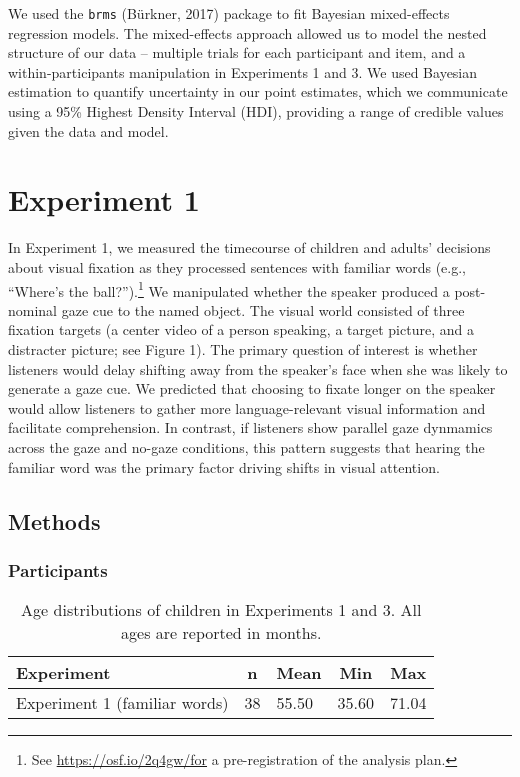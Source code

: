\documentclass[man,floatsintext]{apa6}
\let\rmarkdownfootnote\footnote%
\def\footnote{\protect\rmarkdownfootnote}
\begin{document}
We used the \texttt{brms} (Bürkner, 2017) package to fit Bayesian
mixed-effects regression models. The mixed-effects approach allowed us
to model the nested structure of our data -- multiple trials for each
participant and item, and a within-participants manipulation in
Experiments 1 and 3. We used Bayesian estimation to quantify uncertainty
in our point estimates, which we communicate using a 95\% Highest
Density Interval (HDI), providing a range of credible values given the
data and model.

\section{Experiment 1}\label{experiment-1}

In Experiment 1, we measured the timecourse of children and adults'
decisions about visual fixation as they processed sentences with
familiar words (e.g., \enquote{Where's the ball?}).\footnote{See
  \url{https://osf.io/2q4gw/for} a pre-registration of the analysis
  plan.} We manipulated whether the speaker produced a post-nominal gaze
cue to the named object. The visual world consisted of three fixation
targets (a center video of a person speaking, a target picture, and a
distracter picture; see Figure 1). The primary question of interest is
whether listeners would delay shifting away from the speaker's face when
she was likely to generate a gaze cue. We predicted that choosing to
fixate longer on the speaker would allow listeners to gather more
language-relevant visual information and facilitate comprehension. In
contrast, if listeners show parallel gaze dynmamics across the gaze and
no-gaze conditions, this pattern suggests that hearing the familiar word
was the primary factor driving shifts in visual attention.

\subsection{Methods}\label{methods}

\subsubsection{Participants}\label{participants}

\begin{table}[tbp]
\begin{center}
\begin{threeparttable}
\caption{\label{tab:make-ss-table}Age distributions of children in Experiments 1 and 3. All ages are reported in months.}
\begin{tabular}{lllll}
\toprule
Experiment & \multicolumn{1}{c}{n} & \multicolumn{1}{c}{Mean} & \multicolumn{1}{c}{Min} & \multicolumn{1}{c}{Max}\\
\midrule
Experiment 1 (familiar words) & 38 & 55.50 & 35.60 & 71.04\\
\bottomrule
\end{tabular}
\end{threeparttable}
\end{center}
\end{table}
\end{document}
